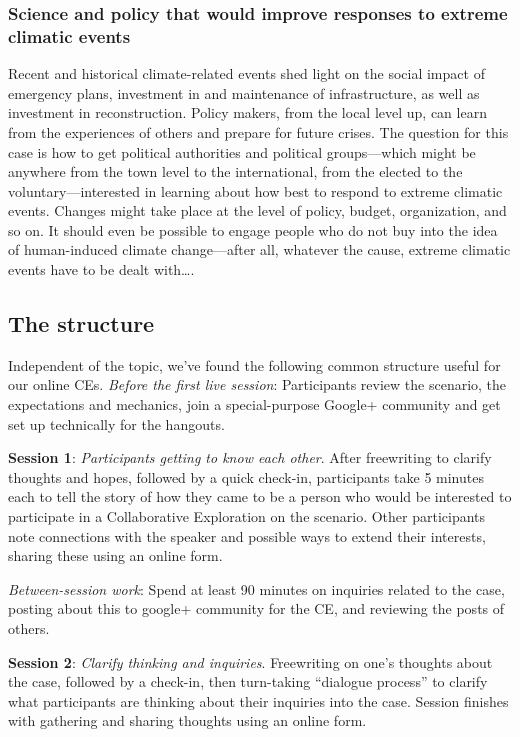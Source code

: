 \subsubsection{Science and policy that would improve responses to
extreme climatic events}

Recent and historical climate-related events shed light on the social
impact of emergency plans, investment in and maintenance of
infrastructure, as well as investment in reconstruction. Policy makers,
from the local level up, can learn from the experiences of others and
prepare for future crises. The question for this case is how to get
political authorities and political groups---which might be anywhere
from the town level to the international, from the elected to the
voluntary---interested in learning about how best to respond to extreme
climatic events. Changes might take place at the level of policy,
budget, organization, and so on. It should even be possible to engage
people who do not buy into the idea of human-induced climate
change---after all, whatever the cause, extreme climatic events have to
be dealt with\ldots{}.

\subsection{The structure}

Independent of the topic, we've found the following common structure
useful for our online CEs. \emph{Before the first live session}:
Participants review the scenario, the expectations and mechanics, join a
special-purpose Google+ community and get set up technically for the
hangouts.

\medskip\noindent \textbf{Session 1}: \emph{Participants getting to know each
other}. After freewriting to clarify thoughts and hopes, followed by a
quick check-in, participants take 5 minutes each to tell the story of
how they came to be a person who would be interested to participate in a
Collaborative Exploration on the scenario. Other participants note
connections with the speaker and possible ways to extend their
interests, sharing these using an online form.

\medskip\noindent \emph{Between-session
work}: Spend at least 90 minutes on inquiries related to the case,
posting about this to google+ community for the CE, and reviewing the
posts of others.

\medskip\noindent \textbf{Session 2}: \emph{Clarify thinking and
inquiries}. Freewriting on one's thoughts about the case, followed by a
check-in, then turn-taking ``dialogue process'' to clarify what
participants are thinking about their inquiries into the case. Session
finishes with gathering and sharing thoughts using an online form.


